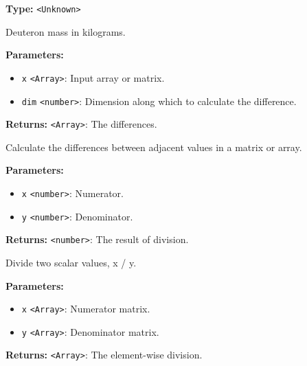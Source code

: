 \documentclass[12pt,a4paper]{article}
\begin{document}
\noindent \textbf{Type:} \texttt{<Unknown>}

\noindent Deuteron mass in kilograms.

\vspace{5mm}
\noindent {}


\noindent \textbf{Parameters:}
\begin{itemize}
  \item \texttt{x} \texttt{<Array>}: Input array or matrix.
  \item \texttt{dim} \texttt{<number>}: Dimension along which to calculate the difference.
\end{itemize}

\noindent \textbf{Returns:} \texttt{<Array>}: The differences.

\noindent Calculate the differences between adjacent values in a matrix or array.

\vspace{5mm}
\noindent {}


\noindent \textbf{Parameters:}
\begin{itemize}
  \item \texttt{x} \texttt{<number>}: Numerator.
  \item \texttt{y} \texttt{<number>}: Denominator.
\end{itemize}

\noindent \textbf{Returns:} \texttt{<number>}: The result of division.

\noindent Divide two scalar values, x / y.

\vspace{5mm}
\noindent {}


\noindent \textbf{Parameters:}
\begin{itemize}
  \item \texttt{x} \texttt{<Array>}: Numerator matrix.
  \item \texttt{y} \texttt{<Array>}: Denominator matrix.
\end{itemize}

\noindent \textbf{Returns:} \texttt{<Array>}: The element-wise division.
\end{document}
